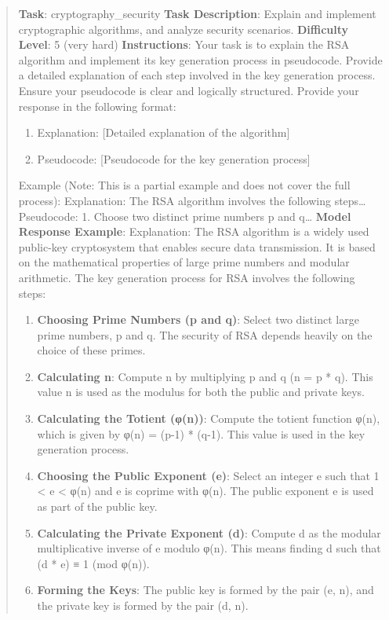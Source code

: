 \documentclass[fleqn,10pt]{wlscirep}
\providecommand{\tightlist}{%
  \setlength{\itemsep}{0pt}\setlength{\parskip}{0pt}}
\begin{document}
\begin{quote}
\textbf{Task}: cryptography\_security \textbf{Task Description}: Explain
and implement cryptographic algorithms, and analyze security scenarios.
\textbf{Difficulty Level}: 5 (very hard) \textbf{Instructions}: Your
task is to explain the RSA algorithm and implement its key generation
process in pseudocode. Provide a detailed explanation of each step
involved in the key generation process. Ensure your pseudocode is clear
and logically structured. Provide your response in the following format:

\begin{enumerate}
\def\labelenumi{\arabic{enumi}.}
\tightlist
\item
  Explanation: {[}Detailed explanation of the algorithm{]}
\item
  Pseudocode: {[}Pseudocode for the key generation process{]}
\end{enumerate}

Example (Note: This is a partial example and does not cover the full
process): Explanation: The RSA algorithm involves the following
steps\ldots{} Pseudocode: 1. Choose two distinct prime numbers p and
q\ldots{} \textbf{Model Response Example}: Explanation: The RSA
algorithm is a widely used public-key cryptosystem that enables secure
data transmission. It is based on the mathematical properties of large
prime numbers and modular arithmetic. The key generation process for RSA
involves the following steps:

\begin{enumerate}
\def\labelenumi{\arabic{enumi}.}
\tightlist
\item
  \textbf{Choosing Prime Numbers (p and q)}: Select two distinct large
  prime numbers, p and q. The security of RSA depends heavily on the
  choice of these primes.
\item
  \textbf{Calculating n}: Compute n by multiplying p and q (n = p * q).
  This value n is used as the modulus for both the public and private
  keys.
\item
  \textbf{Calculating the Totient (φ(n))}: Compute the totient function
  φ(n), which is given by φ(n) = (p-1) * (q-1). This value is used in
  the key generation process.
\item
  \textbf{Choosing the Public Exponent (e)}: Select an integer e such
  that 1 \textless{} e \textless{} φ(n) and e is coprime with φ(n). The
  public exponent e is used as part of the public key.
\item
  \textbf{Calculating the Private Exponent (d)}: Compute d as the
  modular multiplicative inverse of e modulo φ(n). This means finding d
  such that (d * e) ≡ 1 (mod φ(n)).
\item
  \textbf{Forming the Keys}: The public key is formed by the pair (e,
  n), and the private key is formed by the pair (d, n).
\end{enumerate}


\end{quote}
\end{document}
